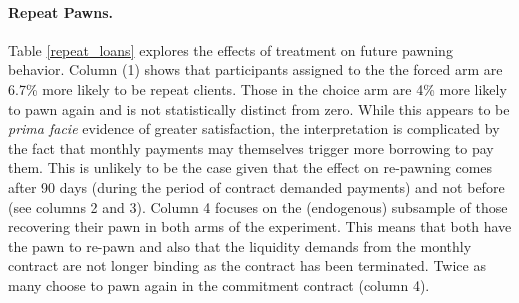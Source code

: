 \documentclass[oneside,11pt]{article}
\begin{document}
\paragraph{Repeat Pawns.}
Table \ref{repeat_loans} explores the effects of treatment on future pawning behavior.
Column (1) shows that participants assigned to the the forced arm are 6.7\% more likely to be repeat clients.
Those in the choice arm are 4\% more likely to pawn again and is not statistically distinct from zero.  While this appears to be \emph{prima facie} evidence of greater satisfaction, the interpretation is complicated by the fact that monthly payments may themselves trigger more borrowing to pay them. This is unlikely to be the case given that the effect on re-pawning comes after 90 days (during the period of contract demanded payments) and not before  (see columns 2 and 3). Column 4 focuses on the (endogenous) subsample of those recovering their pawn in both arms of the experiment. This means that both have the pawn to re-pawn and also that the liquidity demands from the monthly contract are not longer binding as the contract has been terminated. Twice as many choose to pawn again in the commitment contract (column 4).
\end{document}
